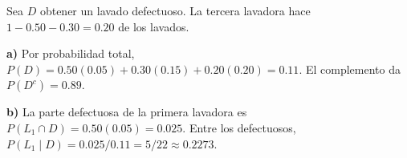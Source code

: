 Sea $D$ obtener un lavado defectuoso. La tercera lavadora
hace $1-0.50-0.30=0.20$ de los lavados.

\textbf{a)} Por probabilidad total,
$P(D)=0.50(0.05)+0.30(0.15)+0.20(0.20)=0.11$.
El complemento da $\boxed{P(D^c)=0.89}$.

\textbf{b)} La parte defectuosa de la primera lavadora es
$P(L_1\cap D)=0.50(0.05)=0.025$. Entre los defectuosos,
$P(L_1\mid D)=0.025/0.11=\boxed{5/22\approx0.2273}$.
